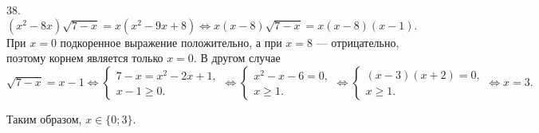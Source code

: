 38. $(x^2-8x)\sqrt{7-x}=x(x^2-9x+8)\Leftrightarrow x(x-8)\sqrt{7-x}=x(x-8)(x-1).$ При $x=0$ подкоренное выражение положительно, а при $x=8$ --- отрицательно, поэтому корнем является только $x=0.$ В другом случае $\sqrt{7-x}=x-1\Leftrightarrow \begin{cases} 7-x=x^2-2x+1,\\ x-1\geqslant0.\end{cases}
\Leftrightarrow \begin{cases} x^2-x-6=0,\\ x\geqslant1.\end{cases}
\Leftrightarrow \begin{cases} (x-3)(x+2)=0,\\ x\geqslant1.\end{cases}\Leftrightarrow x=3.$

Таким образом, $x\in\{0; 3\}.$\\
